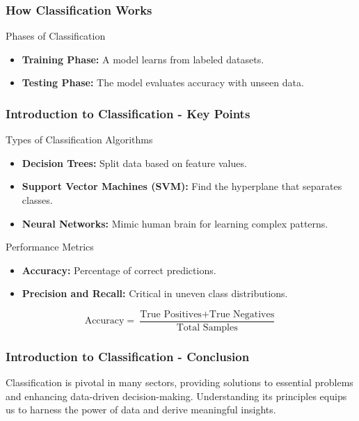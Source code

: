 \documentclass[aspectratio=169]{beamer}
\begin{document}
\begin{frame}[fragile]
    \frametitle{How Classification Works}
    \begin{block}{Phases of Classification}
        \begin{itemize}
            \item \textbf{Training Phase:} A model learns from labeled datasets.
            \item \textbf{Testing Phase:} The model evaluates accuracy with unseen data.
        \end{itemize}
    \end{block}
\end{frame}

\begin{frame}[fragile]
    \frametitle{Introduction to Classification - Key Points}
    \begin{block}{Types of Classification Algorithms}
        \begin{itemize}
            \item \textbf{Decision Trees:} Split data based on feature values.
            \item \textbf{Support Vector Machines (SVM):} Find the hyperplane that separates classes.
            \item \textbf{Neural Networks:} Mimic human brain for learning complex patterns.
        \end{itemize}
    \end{block}
    \begin{block}{Performance Metrics}
        \begin{itemize}
            \item \textbf{Accuracy:} Percentage of correct predictions.
            \item \textbf{Precision and Recall:} Critical in uneven class distributions.
        \end{itemize}
        \begin{equation}
            \text{Accuracy} = \frac{\text{True Positives} + \text{True Negatives}}{\text{Total Samples}}
        \end{equation}
    \end{block}
\end{frame}

\begin{frame}[fragile]
    \frametitle{Introduction to Classification - Conclusion}
    Classification is pivotal in many sectors, providing solutions to essential problems and enhancing data-driven decision-making. Understanding its principles equips us to harness the power of data and derive meaningful insights.
\end{frame}
\end{document}
